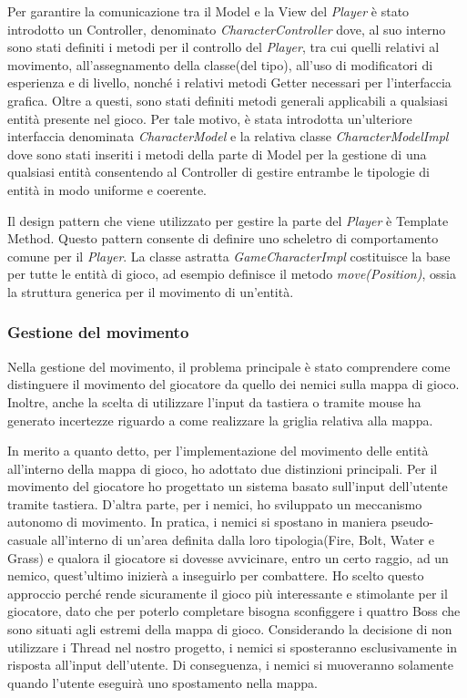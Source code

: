 \documentclass[a4paper,12pt]{report}
\begin{document}
Per garantire la comunicazione tra il Model e la View del \textit{Player} è stato introdotto un Controller, denominato \textit{CharacterController} dove, al suo interno sono stati definiti i metodi per il controllo del \textit{Player}, tra cui quelli relativi al movimento, all'assegnamento della classe(del tipo), all'uso di modificatori di esperienza e di livello, nonché i relativi metodi Getter necessari per l'interfaccia grafica.
Oltre a questi, sono stati definiti metodi generali applicabili a qualsiasi entità presente nel gioco. 
Per tale motivo, è stata introdotta un'ulteriore interfaccia denominata \textit{CharacterModel} e la relativa classe \textit{CharacterModelImpl} dove sono stati inseriti i metodi della parte di Model per la gestione di una qualsiasi entità consentendo al Controller di gestire entrambe le tipologie di entità in modo uniforme e coerente.

Il design pattern che viene utilizzato per gestire la parte del \textit{Player} è Template Method. Questo pattern consente di definire uno scheletro di comportamento comune per il \textit{Player}. La classe astratta \textit{GameCharacterImpl} costituisce la base per tutte le entità di gioco, ad esempio definisce il metodo \textit{move(Position)}, ossia la struttura generica per il movimento di un'entità.

\subsubsection{Gestione del movimento}
Nella gestione del movimento, il problema principale è stato comprendere come distinguere il movimento del giocatore da quello dei nemici sulla mappa di gioco. Inoltre, anche la scelta di utilizzare l'input da tastiera o tramite mouse ha generato incertezze riguardo a come realizzare la griglia relativa alla mappa.

In merito a quanto detto, per l'implementazione del movimento delle entità all'interno della mappa di gioco, ho adottato due distinzioni principali. Per il movimento del giocatore ho progettato un sistema basato sull'input dell'utente tramite tastiera. D'altra parte, per i nemici, ho sviluppato un meccanismo autonomo di movimento. In pratica, i nemici si spostano in maniera pseudo-casuale all'interno di un'area definita dalla loro tipologia(Fire, Bolt, Water e Grass) e qualora il giocatore si dovesse avvicinare, entro un certo raggio, ad un nemico, quest'ultimo inizierà a inseguirlo per combattere. Ho scelto questo approccio perché rende sicuramente il gioco più interessante e stimolante per il giocatore, dato che per poterlo completare bisogna sconfiggere i quattro Boss che sono situati agli estremi della mappa di gioco.
Considerando la decisione di non utilizzare i Thread nel nostro progetto, i nemici si sposteranno esclusivamente in risposta all'input dell'utente. Di conseguenza, i nemici si muoveranno solamente quando l'utente eseguirà uno spostamento nella mappa.
\end{document}
